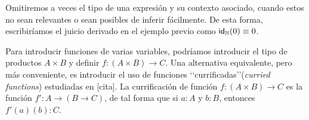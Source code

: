 \documentclass[../main.tex]{subfiles}
\begin{document}
\begin{notation}
    Omitiremos a veces el tipo de una expresión y su contexto asociado, cuando estos no sean relevantes o sean posibles de inferir fácilmente. De esta forma, escribiríamos el juicio derivado en el ejemplo previo como $\idfunc[\N] (0) \equiv 0$.
\end{notation}

Para introducir funciones de varias variables, podríamos introducir el tipo de productos $A \times B$ y definir $f: (A \times B)\to C$.
Una alternativa equivalente, pero m\'as conveniente, es {\color{red} introducir} el uso de funciones \lq\lq currificadas\rq\rq (\textit{curried functions}) {\color{red} estudiadas en [cita]}. La currificación de {\color{red} funci\'on} $f{:(A\times B)\to C}$ es {\color{red} la funci\'on} $f': A \to (B \to C)$, de tal forma que si $a:A$ y $b:B$, entonces $f'(a)(b):C$.
\end{document}
